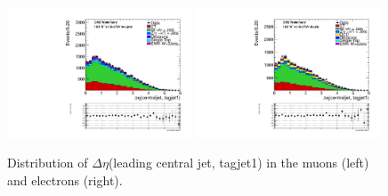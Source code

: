 \begin{figure}
\begin{center}
\includegraphics[width=0.49\textwidth]{figs/n-1_plots_mu/mu_EWK_W_2jets_centraljet_tagjet1_deltaeta_mjj_600_tagjet1_60_tagjet2_50_Zeppenfield_1point2_EWKW2jets.pdf}
\includegraphics[width=0.49\textwidth]{figs/n-1_plots_el/el_EWK_W_2jets_centraljet_tagjet1_deltaeta_mjj_600_tagjet1_60_tagjet2_50_Zeppenfield_1point2_met_30_WmT_30_EWKW2jets.pdf}
\end{center}
\caption{Distribution of $\Delta \eta$(leading central jet, tagjet1) in the muons (left) and electrons (right).}
\label{fig:centraljetdeltaetajettagjet1_20}
\end{figure}

